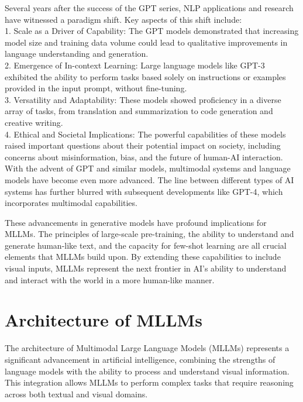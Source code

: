 Several years after the success of the GPT series, NLP applications and research have witnessed a paradigm shift. Key aspects of this shift include:
\\
1. Scale as a Driver of Capability: The GPT models demonstrated that increasing model size and training data volume could lead to qualitative improvements in language understanding and generation.
\\
2. Emergence of In-context Learning: Large language models like GPT-3 exhibited the ability to perform tasks based solely on instructions or examples provided in the input prompt, without fine-tuning.
\\
3. Versatility and Adaptability: These models showed proficiency in a diverse array of tasks, from translation and summarization to code generation and creative writing.
\\
4. Ethical and Societal Implications: The powerful capabilities of these models raised important questions about their potential impact on society, including concerns about misinformation, bias, and the future of human-AI interaction.
\\
With the advent of GPT and similar models, multimodal systems and language models have become even more advanced. The line between different types of AI systems has further blurred with subsequent developments like GPT-4, which incorporates multimodal capabilities.

These advancements in generative models have profound implications for MLLMs. The principles of large-scale pre-training, the ability to understand and generate human-like text, and the capacity for few-shot learning are all crucial elements that MLLMs build upon. By extending these capabilities to include visual inputs, MLLMs represent the next frontier in AI's ability to understand and interact with the world in a more human-like manner.

\section{Architecture of MLLMs}


The architecture of Multimodal Large Language Models (MLLMs) represents a significant advancement in artificial intelligence, combining the strengths of language models with the ability to process and understand visual information. This integration allows MLLMs to perform complex tasks that require reasoning across both textual and visual domains.

